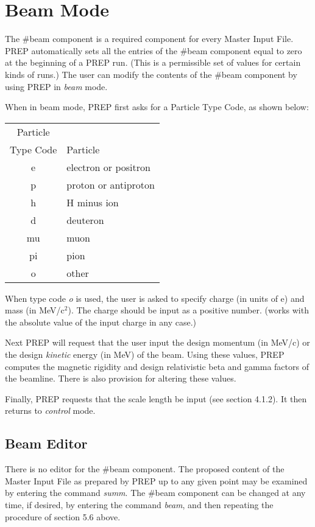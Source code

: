 \section{Beam Mode} The \#beam component is a required component for every
Master Input File. PREP automatically sets all the entries of the \#beam
component equal to zero at the beginning of a PREP run. (This is a
permissible set of values for certain kinds of \Mary runs.) The user can
modify the contents of the \#beam component by using PREP in {\em beam}
mode.

When in beam mode, PREP first asks for a Particle Type Code, as shown
below:

\begin{center}
\begin{tabular}{cl} Particle & \\ Type Code & Particle \\ \hline e &
electron or positron \\ p & proton or antiproton \\ h & H minus ion \\ d &
deuteron \\ mu & muon \\ pi & pion \\ o & other
\end{tabular}
\end{center} When type code {\em o} is used, the user is asked to specify
charge (in units of e) and mass (in MeV/$\mbox{c}^2$). The charge should be
input as a positive number. (\Mary works with the absolute value of the
input charge in any case.)

Next PREP will request that the user input the design momentum (in MeV/c)
or the design {\em kinetic} energy (in MeV) of the beam. Using these
values, PREP computes the magnetic rigidity and design relativistic beta
and gamma factors of the beamline. There is also provision for altering
these values.

Finally, PREP requests that the scale length be input (see section 4.1.2).
It then returns to {\em control} mode.

\subsection{Beam Editor} There is no editor for the \#beam component. The
proposed content of the Master Input File as prepared by PREP up to any
given point may be examined by entering the command {\em summ}. The \#beam
component can be changed at any time, if desired, by entering the command
{\em beam}, and then repeating the procedure of section 5.6 above.

